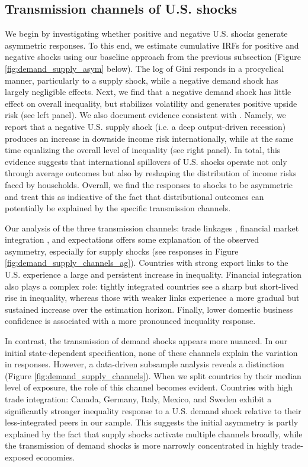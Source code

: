 \documentclass[12pt, a4paper]{article}
\begin{document}
\subsection{Transmission channels of U.S. shocks}
We begin by investigating whether positive and negative U.S. shocks generate asymmetric responses. To this end, we estimate cumulative IRFs for positive and negative shocks using our baseline approach from the previous subsection (Figure \ref{fig:demand_supply_asym} below). The log of Gini responds in a procyclical manner, particularly to a supply shock, while a negative demand shock has largely negligible effects. Next, we find that a negative demand shock has little effect on overall inequality, but stabilizes volatility and generates positive upside risk (see left panel). We also document evidence consistent with \textcite{guvenen2014nature}. Namely, we report that a negative U.S. supply shock (i.e. a deep output-driven recession) produces an increase in downside income risk internationally, while at the same time equalizing the overall level of inequality (see right panel). In total, this evidence suggests that international spillovers of U.S. shocks operate not only through average outcomes but also by reshaping the distribution of income risks faced by households. Overall, we find the responses to shocks to be asymmetric and treat this as indicative of the fact that distributional outcomes can potentially be explained by the specific transmission channels.

Our analysis of the three transmission channels: trade linkages \parencite{corsetti2011multilateral}, financial market integration \parencite{faccini2016international}, and expectations \parencite{klein2021real} offers some explanation of the observed asymmetry, especially for supply shocks (see responses in Figure \ref{fig:demand_supply_channels_ag}). Countries with strong export links to the U.S. experience a large and persistent increase in inequality. Financial integration also plays a complex role: tightly integrated countries see a sharp but short-lived rise in inequality, whereas those with weaker links experience a more gradual but sustained increase over the estimation horizon. Finally, lower domestic business confidence is associated with a more pronounced inequality response.

In contrast, the transmission of demand shocks appears more nuanced. In our initial state-dependent specification, none of these channels explain the variation in responses. However, a data-driven subsample analysis reveals a distinction (Figure \ref{fig:demand_supply_channels}). When we split countries by their median level of exposure, the role of this channel becomes evident. Countries with high trade integration: Canada, Germany, Italy, Mexico, and Sweden exhibit a significantly stronger inequality response to a U.S. demand shock relative to their less-integrated peers in our sample. This suggests the initial asymmetry is partly explained by the fact that supply shocks activate multiple channels broadly, while the transmission of demand shocks is more narrowly concentrated in highly trade-exposed economies.
\end{document}
